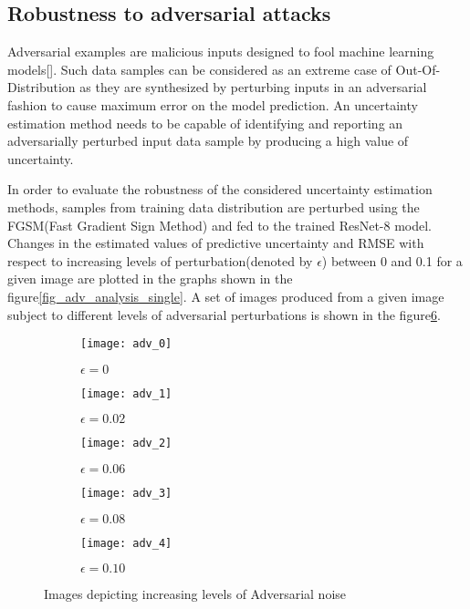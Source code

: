 \subsection{Robustness to adversarial attacks}
Adversarial examples are malicious inputs designed to fool machine learning models[\cite{kurakin2016adversarial}]. Such data samples can be considered as an extreme case of Out-Of-Distribution as they are synthesized by perturbing inputs in an adversarial fashion to cause maximum error on the model prediction. An uncertainty estimation method needs to be capable of identifying and reporting an adversarially perturbed input data sample by producing a high value of uncertainty. 

In order to evaluate the robustness of the considered uncertainty estimation methods, samples from training data distribution are perturbed using the FGSM(Fast Gradient Sign Method)\cite{goodfellow2015explaining} and fed to the trained ResNet-8 model. Changes in the estimated values of predictive uncertainty and RMSE with respect to increasing levels of perturbation(denoted by $\epsilon$) between 0 and 0.1 for a given image are plotted in the graphs shown in the figure\ref{fig_adv_analysis_single}. A set of images produced from a given image subject to different levels of adversarial perturbations is shown in the figure\ref{fig_adv_example}.

\begin{figure}[h]
	\centering
	\begin{subfigure}[b]{0.19\textwidth}
		\centering
		\texttt{[image: adv\_0]}
		\caption{$\epsilon=0$}
		\label{fig:y equals x}
	\end{subfigure}
	\hfill
	\begin{subfigure}[b]{0.19\textwidth}
		\centering
		\texttt{[image: adv\_1]}
		\caption{$\epsilon=0.02$}
		\label{fig:three sin x}
	\end{subfigure}
	\hfill
	\begin{subfigure}[b]{0.19\textwidth}
		\centering
		\texttt{[image: adv\_2]}
		\caption{$\epsilon=0.06$}
		\label{fig:five over x}
	\end{subfigure}
	\hfill
	\begin{subfigure}[b]{0.19\textwidth}
		\centering
		\texttt{[image: adv\_3]}
		\caption{$\epsilon=0.08$}
		\label{fig:five over x}
	\end{subfigure}
	\hfill
	\begin{subfigure}[b]{0.19\textwidth}
		\centering
		\texttt{[image: adv\_4]}
		\caption{$\epsilon=0.10$}
		\label{fig:five over x}
	\end{subfigure}
	\caption{Images depicting increasing levels of Adversarial noise}
	\label{fig_adv_example}
\end{figure}

